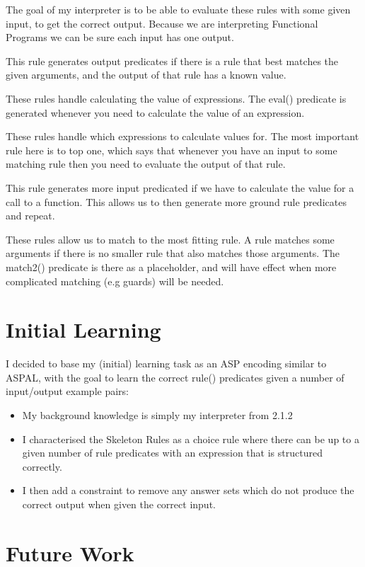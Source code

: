 The goal of my interpreter is to be able to evaluate these rules with some given input, to get the correct output. Because we are interpreting Functional Programs we can be sure each input has one output.



This rule generates output predicates if there is a rule that best matches the given arguments, and the output of that rule has a known value.



These rules handle calculating the value of expressions. The eval() predicate is generated whenever you need to calculate the value of an expression.



These rules handle which expressions to calculate values for. The most important rule here is to top one, which says that whenever you have an input to some matching rule then you need to evaluate the output of that rule.



This rule generates more input predicated if we have to calculate the value for a call to a function. This allows us to then generate more ground rule predicates and repeat.



These rules allow us to match to the most fitting rule. A rule matches some arguments if there is no smaller rule that also matches those arguments. The match2() predicate is there as a placeholder, and will have effect when more complicated matching (e.g guards) will be needed.

\section{Initial Learning}

I decided to base my (initial) learning task as an ASP encoding similar to ASPAL, with the goal to learn the correct rule() predicates given a number of input/output example pairs:

\begin{itemize}
\item My background knowledge is simply my interpreter from 2.1.2
\item I characterised the Skeleton Rules as a choice rule where there can be up to a given number of rule predicates with an expression that is structured correctly. 

\item I then add a constraint to remove any answer sets which do not produce the correct output when given the correct input.

\end{itemize}

\section{Future Work}

\pagebreak
\renewcommand\bibname{{References}}

